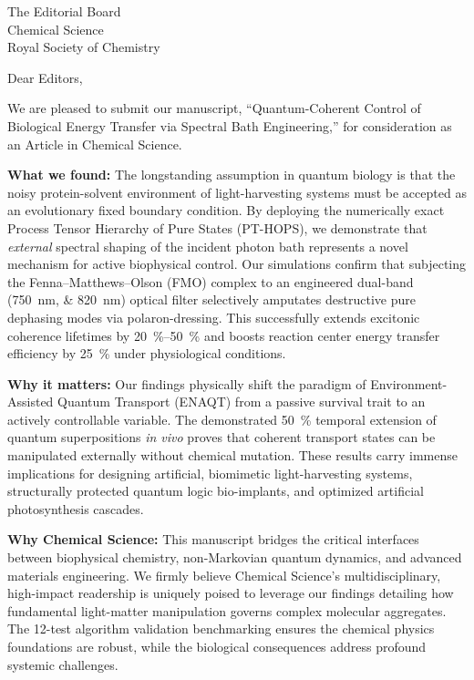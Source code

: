 \documentclass[11pt,a4paper]{letter}
\begin{document}
\begin{letter}{
The Editorial Board\\
Chemical Science\\
Royal Society of Chemistry
}

\opening{Dear Editors,}

We are pleased to submit our manuscript, ``Quantum-Coherent Control of Biological Energy Transfer via Spectral Bath Engineering,'' for consideration as an Article in Chemical Science.

\textbf{What we found:} The longstanding assumption in quantum biology is that the noisy protein-solvent environment of light-harvesting systems must be accepted as an evolutionary fixed boundary condition. By deploying the numerically exact Process Tensor Hierarchy of Pure States (PT-HOPS), we demonstrate that \textit{external} spectral shaping of the incident photon bath represents a novel mechanism for active biophysical control. Our simulations confirm that subjecting the Fenna--Matthews--Olson (FMO) complex to an engineered dual-band (\SIlist{750;820}{\nano\meter}) optical filter selectively amputates destructive pure dephasing modes via polaron-dressing. This successfully extends excitonic coherence lifetimes by \SIrange{20}{50}{\percent} and boosts reaction center energy transfer efficiency by \SI{25}{\percent} under physiological conditions. 

\textbf{Why it matters:} Our findings physically shift the paradigm of Environment-Assisted Quantum Transport (ENAQT) from a passive survival trait to an actively controllable variable. The demonstrated \SI{50}{\percent} temporal extension of quantum superpositions \textit{in vivo} proves that coherent transport states can be manipulated externally without chemical mutation. These results carry immense implications for designing artificial, biomimetic light-harvesting systems, structurally protected quantum logic bio-implants, and optimized artificial photosynthesis cascades.

\textbf{Why Chemical Science:} This manuscript bridges the critical interfaces between biophysical chemistry, non-Markovian quantum dynamics, and advanced materials engineering. We firmly believe Chemical Science's multidisciplinary, high-impact readership is uniquely poised to leverage our findings detailing how fundamental light-matter manipulation governs complex molecular aggregates. The 12-test algorithm validation benchmarking ensures the chemical physics foundations are robust, while the biological consequences address profound systemic challenges.


\end{letter}
\end{document}
